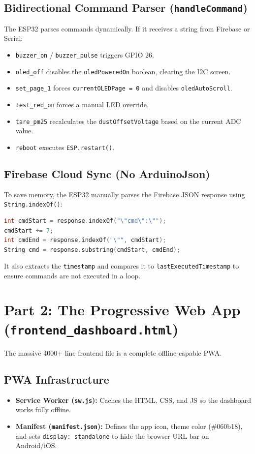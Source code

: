 \documentclass[11pt,a4paper]{article}
\begin{document}
\subsection{Bidirectional Command Parser (\texttt{handleCommand})}
The ESP32 parses commands dynamically. If it receives a string from Firebase or Serial:
\begin{itemize}
    \item \texttt{buzzer\_on} / \texttt{buzzer\_pulse} triggers GPIO 26.
    \item \texttt{oled\_off} disables the \texttt{oledPoweredOn} boolean, clearing the I2C screen.
    \item \texttt{set\_page\_1} forces \texttt{currentOLEDPage = 0} and disables \texttt{oledAutoScroll}.
    \item \texttt{test\_red\_on} forces a manual LED override.
    \item \texttt{tare\_pm25} recalculates the \texttt{dustOffsetVoltage} based on the current ADC value.
    \item \texttt{reboot} executes \texttt{ESP.restart()}.
\end{itemize}

\subsection{Firebase Cloud Sync (No ArduinoJson)}
To save memory, the ESP32 manually parses the Firebase JSON response using \texttt{String.indexOf()}:
\begin{lstlisting}[language=C++]
int cmdStart = response.indexOf("\"cmd\":\"");
cmdStart += 7;
int cmdEnd = response.indexOf("\"", cmdStart);
String cmd = response.substring(cmdStart, cmdEnd);
\end{lstlisting}
It also extracts the \texttt{timestamp} and compares it to \texttt{lastExecutedTimestamp} to ensure commands are not executed in a loop.

\section{Part 2: The Progressive Web App (\texttt{frontend\_dashboard.html})}
The massive 4000+ line frontend file is a complete offline-capable PWA.

\subsection{PWA Infrastructure}
\begin{itemize}
    \item \textbf{Service Worker (\texttt{sw.js}):} Caches the HTML, CSS, and JS so the dashboard works fully offline.
    \item \textbf{Manifest (\texttt{manifest.json}):} Defines the app icon, theme color (\#060b18), and sets \texttt{display: standalone} to hide the browser URL bar on Android/iOS.
\end{itemize}
\end{document}

